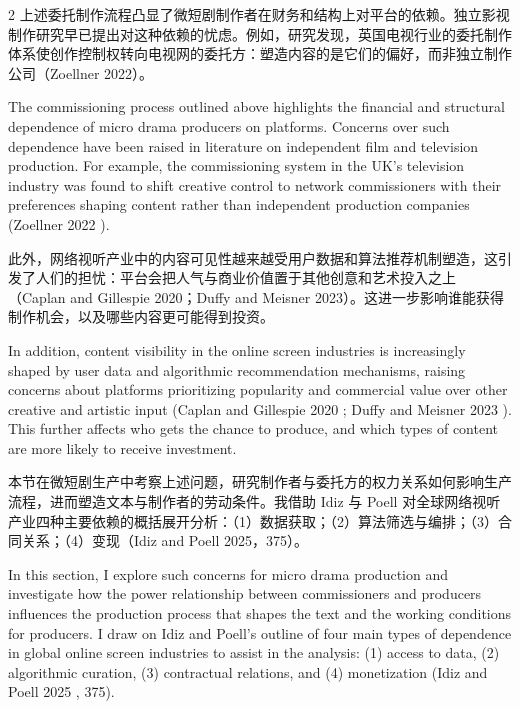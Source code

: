 \documentclass[10pt,a4paper]{article}
\begin{document}
\begin{paracol}{2}
上述委托制作流程凸显了微短剧制作者在财务和结构上对平台的依赖。独立影视制作研究早已提出对这种依赖的忧虑。例如，研究发现，英国电视行业的委托制作体系使创作控制权转向电视网的委托方：塑造内容的是它们的偏好，而非独立制作公司（Zoellner 2022）。\par
\switchcolumn
The commissioning process outlined above highlights the financial and structural dependence of micro drama producers on platforms. Concerns over such dependence have been raised in literature on independent film and television production. For example, the commissioning system in the UK’s television industry was found to shift creative control to network commissioners with their preferences shaping content rather than independent production companies (Zoellner 2022 ).\par
\switchcolumn*
此外，网络视听产业中的内容可见性越来越受用户数据和算法推荐机制塑造，这引发了人们的担忧：平台会把人气与商业价值置于其他创意和艺术投入之上（Caplan and Gillespie 2020；Duffy and Meisner 2023）。这进一步影响谁能获得制作机会，以及哪些内容更可能得到投资。\par
\switchcolumn
In addition, content visibility in the online screen industries is increasingly shaped by user data and algorithmic recommendation mechanisms, raising concerns about platforms prioritizing popularity and commercial value over other creative and artistic input (Caplan and Gillespie 2020 ; Duffy and Meisner 2023 ). This further affects who gets the chance to produce, and which types of content are more likely to receive investment.\par
\switchcolumn*
本节在微短剧生产中考察上述问题，研究制作者与委托方的权力关系如何影响生产流程，进而塑造文本与制作者的劳动条件。我借助 Idiz 与 Poell 对全球网络视听产业四种主要依赖的概括展开分析：（1）数据获取；（2）算法筛选与编排；（3）合同关系；（4）变现（Idiz and Poell 2025，375）。\par
\switchcolumn
In this section, I explore such concerns for micro drama production and investigate how the power relationship between commissioners and producers influences the production process that shapes the text and the working conditions for producers. I draw on Idiz and Poell’s outline of four main types of dependence in global online screen industries to assist in the analysis: (1) access to data, (2) algorithmic curation, (3) contractual relations, and (4) monetization (Idiz and Poell 2025 , 375).\par
\switchcolumn*

\end{paracol}
\end{document}
